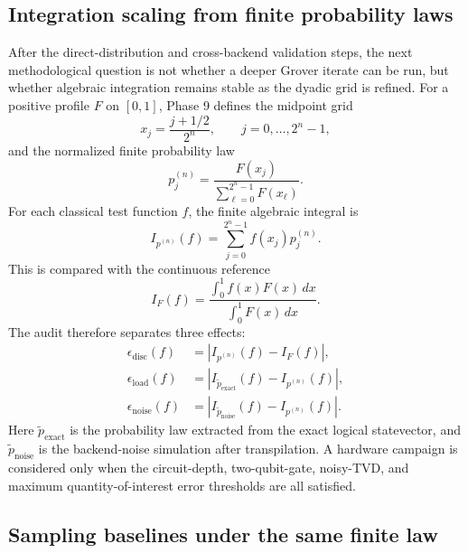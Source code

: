 \subsection{Integration scaling from finite probability laws}

After the direct-distribution and cross-backend validation steps, the next
methodological question is not whether a deeper Grover iterate can be run, but
whether algebraic integration remains stable as the dyadic grid is refined. For
a positive profile \(F\) on \([0,1]\), Phase 9 defines the midpoint grid
\[
  x_j=\frac{j+1/2}{2^n},\qquad j=0,\ldots,2^n-1,
\]
and the normalized finite probability law
\[
  p^{(n)}_j
  =
  \frac{F(x_j)}{\sum_{\ell=0}^{2^n-1}F(x_\ell)}.
\]
For each classical test function \(f\), the finite algebraic integral is
\[
  I_{p^{(n)}}(f)
  =
  \sum_{j=0}^{2^n-1} f(x_j)p^{(n)}_j.
\]
This is compared with the continuous reference
\[
  I_F(f)
  =
  \frac{\int_0^1 f(x)F(x)\,dx}{\int_0^1 F(x)\,dx}.
\]
The audit therefore separates three effects:
\begin{align*}
  \epsilon_{\mathrm{disc}}(f)
  &=
  \left|I_{p^{(n)}}(f)-I_F(f)\right|,\\
  \epsilon_{\mathrm{load}}(f)
  &=
  \left|I_{\tilde p_{\mathrm{exact}}}(f)-I_{p^{(n)}}(f)\right|,\\
  \epsilon_{\mathrm{noise}}(f)
  &=
  \left|I_{\tilde p_{\mathrm{noise}}}(f)-I_{p^{(n)}}(f)\right|.
\end{align*}
Here \(\tilde p_{\mathrm{exact}}\) is the probability law extracted from the
exact logical statevector, and \(\tilde p_{\mathrm{noise}}\) is the
backend-noise simulation after transpilation. A hardware campaign is considered
only when the circuit-depth, two-qubit-gate, noisy-TVD, and maximum
quantity-of-interest error thresholds are all satisfied.

\subsection{Sampling baselines under the same finite law}

